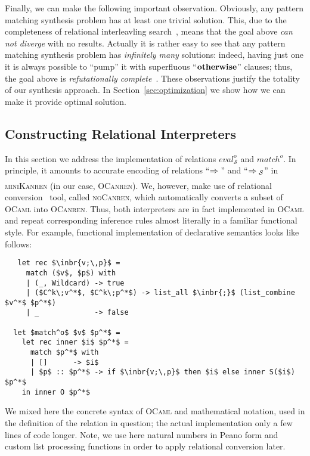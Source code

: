 Finally, we can make the following important observation. Obviously, any pattern matching synthesis problem has at least one trivial solution.
This, due to the completeness of relational interleavling search~\cite{search,certifiedSemantics}, means that the goal above \emph{can not diverge} with
no results. Actually it is rather easy to see that any pattern matching synthesis problem has \emph{infinitely many} solutions: indeed, having just
one it is always possible to ``pump'' it with superfluous ``$\mathbf{otherwise}$'' clauses; thus, the goal above is \emph{refutationally
complete}~\cite{WillThesis,DivergenceTest}. These observations justify the totality of our synthesis approach. In Section~\ref{sec:optimization} we show
how we can make it provide optimal solution.

\subsection{Constructing Relational Interpreters}
\label{sec:relints}

In this section we address the implementation of relations $eval^o_{\mathcal S}$ and $match^o$. In principle, it amounts to accurate encoding of
relations ``$\xRightarrow{}{}$'' and ``$\xRightarrow{}{}_{\mathcal S}$'' in \textsc{miniKanren} (in our case, \textsc{OCanren}). We, however,
make use of relational conversion~\cite{conversion} tool, called \textsc{noCanren}, which automatically converts a subset of \textsc{OCaml} into
\textsc{OCanren}. Thus, both interpreters are in fact implemented in \textsc{OCaml} and repeat corresponding inference rules almost
literally in a familiar functional style. For example, functional implementation of declarative semantics looks like follows:

\begin{lstlisting}
   let rec $\inbr{v;\,p}$ =
     match ($v$, $p$) with
     | (_, Wildcard) -> true
     | ($C^k\;v^*$, $C^k\;p^*$) -> list_all $\inbr{;}$ (list_combine $v^*$ $p^*$)
     | _             -> false

  let $match^o$ $v$ $p^*$ =
    let rec inner $i$ $p^*$ =
      match $p^*$ with
      | []      -> $i$
      | $p$ :: $p^*$ -> if $\inbr{v;\,p}$ then $i$ else inner S($i$) $p^*$
    in inner O $p^*$
\end{lstlisting}

We mixed here the concrete syntax of \textsc{OCaml} and mathematical notation, used in the definition of the relation in question; the actual
implementation only a few lines of code longer. Note, we use here natural numbers in Peano form and custom list processing functions in order
to apply relational conversion later.

